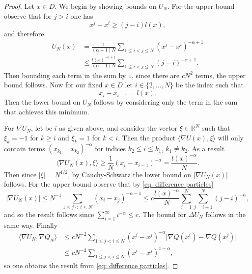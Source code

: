 \documentclass{article}
\begin{document}
\begin{proof}
    Let $x\in D$. We begin by showing bounds on $U_N$. For the upper bound observe that for $j>i$ one has 
    \begin{equation}\label{eq: difference particles}
        x^j-x^i\geq (j-i)l(x),
    \end{equation}
    and therefore
    \begin{align}
    U_N(x)&=\frac{1}{(\alpha-1)N}\sum_{1\leq i<j\leq N}(x^j-x^i)^{-\alpha+1}\nonumber \\
    &\leq \frac{l(x)^{-\alpha+1}}{(\alpha-1)N}\sum_{1\leq i<j\leq N}(j-i)^{-\alpha+1}.
\end{align}
Then bounding each term in the sum by $1$, since there are $cN^2$ terms, the upper bound follows. Now for our fixed $x\in D$ let $i\in \{2,...,N\}$ be the index such that
     \begin{equation}
   x_i-x_{i-1}=l(x).
    \end{equation}
    Then the lower bound on $U_N$ follows by considering only the term in the sum that achieves this minimum.

    For $\nabla U_N$, let be $i$ as given above, and consider the vector $\xi\in \mathbb{R}^N$ such that $\xi_k=-1$ for $k\geq i$ and $\xi_k=1$ for $k<i$. Then the product $  \langle \nabla U(x), \xi\rangle$ will only contain terms $(x_{k_1}-x_{k_2})^{-\alpha}$ for indices $k_2\leq i\leq k_1$, $k_1\not=k_2$. As a result
    \begin{equation}
        \langle \nabla U_N(x), \xi\rangle \geq \frac{1}{N}(x_i-x_{i-1})^{-\alpha}=\frac{l(x)^{-\alpha}}{N}.
    \end{equation}
    Then since $\lvert \xi\rvert=N^{1/2}$, by Cauchy-Schwarz the lower bound on $\lvert \nabla U_N(x)\rvert$ follows. For the upper bound observe that by \eqref{eq: difference particles}
   \begin{equation}
       \lvert \nabla U_N(x)\rvert \leq N^{-1}\sum_{1\leq j<i\leq N}(x_i-x_j)^{-\alpha-1}\leq c\frac{l(x)^{-\alpha}}{N}\sum_{i=1}^N\sum_{j=i+1}^N(j-i)^{-\alpha},
   \end{equation}
   and so the result follows since $\sum_{i=1}^\infty i^{-\alpha}\leq c$. The bound for $\Delta U_N$ follows in the same way. Finally
   \begin{align}
       \langle \nabla U_N, \nabla Q_N\rangle &\leq c N^{-2}\sum_{1\leq j<i\leq N}( x^i-x^j)^{-\alpha}\lvert \nabla Q(x^i)-\nabla Q(x^j)\rvert \nonumber \\
       &\leq c N^{-2}\sum_{1\leq j<i\leq N}( x^i-x^j)^{1-\alpha},
   \end{align}
   so one obtains the result from \eqref{eq: difference particles}.
\end{proof}
\end{document}
